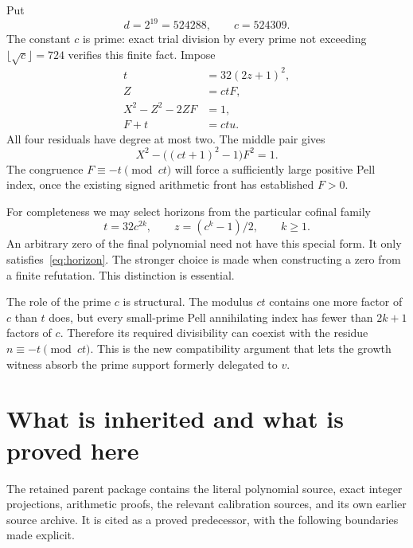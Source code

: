 \documentclass[11pt]{article}
\theoremstyle{definition}
\theoremstyle{remark}
\begin{document}
Put
\begin{equation}\label{eq:constants}
 d=2^{19}=524288,\qquad c=524309.
\end{equation}
The constant $c$ is prime: exact trial division by every prime not exceeding
$\lfloor\sqrt c\rfloor=724$ verifies this finite fact. Impose
\begin{align}
 t&=32(2z+1)^2,\label{eq:horizon}\\
 Z&=ctF,\label{eq:g1}\\
 X^2-Z^2-2ZF&=1,\label{eq:g2}\\
 F+t&=ctu.\label{eq:g3}
\end{align}
All four residuals have degree at most two. The middle pair gives
\begin{equation}\label{eq:pell}
 X^2-\bigl((ct+1)^2-1\bigr)F^2=1.
\end{equation}
The congruence $F\equiv-t\pmod{ct}$ will force a sufficiently large
positive Pell index, once the existing signed arithmetic front has
established $F>0$.

For completeness we may select horizons from the particular cofinal family
\begin{equation}\label{eq:cofinal}
 t=32c^{2k},\qquad z=(c^k-1)/2,\qquad k\ge1.
\end{equation}
An arbitrary zero of the final polynomial need not have this special form.
It only satisfies~\eqref{eq:horizon}. The stronger choice is made when
constructing a zero from a finite refutation. This distinction is essential.

The role of the prime $c$ is structural. The modulus $ct$ contains one more
factor of $c$ than $t$ does, but every small-prime Pell annihilating index
has fewer than $2k+1$ factors of $c$. Therefore its required divisibility
can coexist with the residue $n\equiv-t\pmod{ct}$. This is the new
compatibility argument that lets the growth witness absorb the prime
support formerly delegated to $v$.

\section{What is inherited and what is proved here}\label{sec:inherited}

The retained parent package contains the literal polynomial source, exact
integer projections, arithmetic proofs, the relevant calibration sources,
and its own earlier source archive. It is cited as a proved predecessor,
with the following boundaries made explicit.
\end{document}
